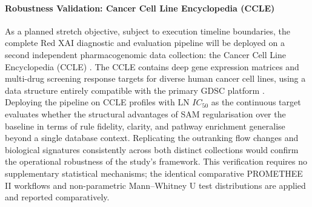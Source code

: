 \paragraph{Robustness Validation: Cancer Cell Line Encyclopedia (CCLE)}
\label{para:robustness_ccle}
As a planned stretch objective, subject to execution timeline boundaries, the complete 
Red XAI diagnostic and evaluation pipeline will be deployed on a second independent 
pharmacogenomic data collection: the Cancer Cell Line Encyclopedia (CCLE) 
\cite{Barretina2012}. The CCLE contains deep gene expression matrices and multi-drug 
screening response targets for diverse human cancer cell lines, using a data structure 
entirely compatible with the primary GDSC platform \cite{Baptista2021, Partin2023}. 
\\
Deploying the pipeline on CCLE profiles with $\text{LN } IC_{50}$ as the continuous target 
evaluates whether the structural advantages of SAM regularisation over the baseline 
in terms of rule fidelity, clarity, and pathway enrichment generalise beyond a single 
database context. Replicating the outranking flow changes and biological signatures 
consistently across both distinct collections would confirm the operational robustness 
of the study's framework. This verification requires no supplementary statistical 
mechanisms; the identical comparative PROMETHEE II workflows and non-parametric 
Mann--Whitney U test distributions are applied and reported comparatively.